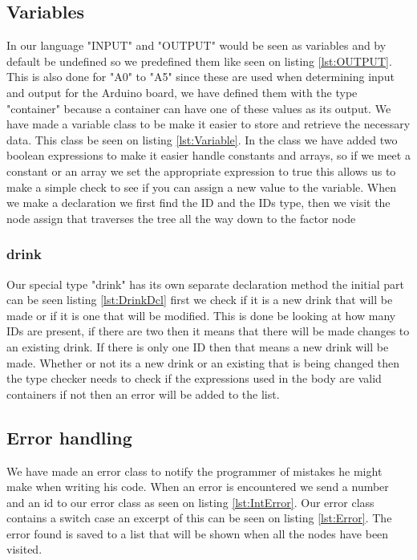 \subsection*{Variables}
In our language "INPUT" and "OUTPUT" would be seen as variables and by default be undefined so we predefined them like seen on listing \ref{lst:OUTPUT}. This is also done for "A0" to "A5" since these are used when determining input and output for the Arduino board, we have defined them with the type "container" because a container can have one of these values as its output.
We have made a variable class to be make it easier to store and retrieve the necessary data. This class be seen on listing \ref{lst:Variable}. In the class we have added two boolean expressions to make it easier handle constants and arrays, so if we meet a constant or an array we set the appropriate expression to true this allows us to make a simple check to see if you can assign a new value to the variable.
When we make a declaration we first find the ID and the IDs type, then we visit the node assign that traverses the tree all the way down to the factor node%

\subsubsection*{drink}
Our special type "drink" has its own separate declaration method the initial part can be seen listing \ref{lst:DrinkDcl} first we check if it is a new drink that will be made or if it is one that will be modified. This is done be looking at how many IDs are present, if there are two then it means that there will be made changes to an existing drink. If there is only one ID then that means a new drink will be made.
Whether or not its a new drink or an existing that is being changed then the type checker needs to check if the expressions used in the body are valid containers if not then an error will be added to the list.

\subsection*{Error handling}
We have made an error class to notify the programmer of mistakes he might make when writing his code. When an error is encountered we send a number and an id to our error class as seen on listing \ref{lst:IntError}.
Our error class contains a switch case an excerpt of this can be seen on listing \ref{lst:Error}. The error found is saved to a list that will be shown when all the nodes have been visited.
